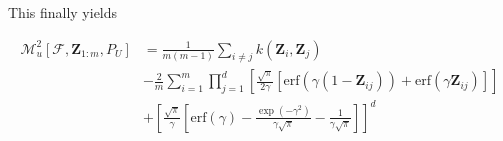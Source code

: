 \documentclass[10pt,a4paper]{article}
\begin{document}
This finally yields

\begin{equation}
\begin{aligned}
\mathcal{M}_u^2[\mathcal{F}, \boldsymbol{Z}_{1:m}, P_U]  &= \frac{1}{m(m-1)}\sum_{i\neq j}k(\boldsymbol{Z}_{i}, \boldsymbol{Z}_{j})\\
& - \frac{2}{m}\sum_{i=1}^{m}\prod_{j=1}^{d}\left[\frac{\sqrt{\pi}}{2\gamma}[\mathrm{erf}(\gamma(1 - \boldsymbol{Z}_{ij})) + \mathrm{erf}(\gamma\boldsymbol{Z}_{ij})]\right]\\
& + \left[\frac{\sqrt{\pi}}{\gamma}\left[\mathrm{erf}(\gamma) - \frac{\exp(-\gamma^2)}{\gamma\sqrt{\pi}} - \frac{1}{\gamma\sqrt{\pi}}\right]\right]^d
\end{aligned}
\end{equation}
\end{document}
